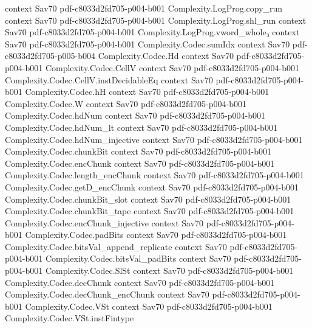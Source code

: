 \begin{theorem}
  {context}
  {Sav70}
  {pdf-c8033d2fd705-p004-b001}
\proofstep
  {Complexity.LogProg.copy_run}
  {context}
  {Sav70}
  {pdf-c8033d2fd705-p004-b001}
\proofstep
  {Complexity.LogProg.shl_run}
  {context}
  {Sav70}
  {pdf-c8033d2fd705-p004-b001}
\proofstep
  {Complexity.LogProg.vword_whole₃}
  {context}
  {Sav70}
  {pdf-c8033d2fd705-p004-b001}
\proofstep
  {Complexity.Codec.sumIdx}
  {context}
  {Sav70}
  {pdf-c8033d2fd705-p005-b004}
\proofstep
  {Complexity.Codec.Hd}
  {context}
  {Sav70}
  {pdf-c8033d2fd705-p004-b001}
\proofstep
  {Complexity.Codec.CellV}
  {context}
  {Sav70}
  {pdf-c8033d2fd705-p004-b001}
\proofstep
  {Complexity.Codec.CellV.instDecidableEq}
  {context}
  {Sav70}
  {pdf-c8033d2fd705-p004-b001}
\proofstep
  {Complexity.Codec.hH}
  {context}
  {Sav70}
  {pdf-c8033d2fd705-p004-b001}
\proofstep
  {Complexity.Codec.W}
  {context}
  {Sav70}
  {pdf-c8033d2fd705-p004-b001}
\proofstep
  {Complexity.Codec.hdNum}
  {context}
  {Sav70}
  {pdf-c8033d2fd705-p004-b001}
\proofstep
  {Complexity.Codec.hdNum_lt}
  {context}
  {Sav70}
  {pdf-c8033d2fd705-p004-b001}
\proofstep
  {Complexity.Codec.hdNum_injective}
  {context}
  {Sav70}
  {pdf-c8033d2fd705-p004-b001}
\proofstep
  {Complexity.Codec.chunkBit}
  {context}
  {Sav70}
  {pdf-c8033d2fd705-p004-b001}
\proofstep
  {Complexity.Codec.encChunk}
  {context}
  {Sav70}
  {pdf-c8033d2fd705-p004-b001}
\proofstep
  {Complexity.Codec.length_encChunk}
  {context}
  {Sav70}
  {pdf-c8033d2fd705-p004-b001}
\proofstep
  {Complexity.Codec.getD_encChunk}
  {context}
  {Sav70}
  {pdf-c8033d2fd705-p004-b001}
\proofstep
  {Complexity.Codec.chunkBit_slot}
  {context}
  {Sav70}
  {pdf-c8033d2fd705-p004-b001}
\proofstep
  {Complexity.Codec.chunkBit_tape}
  {context}
  {Sav70}
  {pdf-c8033d2fd705-p004-b001}
\proofstep
  {Complexity.Codec.encChunk_injective}
  {context}
  {Sav70}
  {pdf-c8033d2fd705-p004-b001}
\proofstep
  {Complexity.Codec.padBits}
  {context}
  {Sav70}
  {pdf-c8033d2fd705-p004-b001}
\proofstep
  {Complexity.Codec.bitsVal_append_replicate}
  {context}
  {Sav70}
  {pdf-c8033d2fd705-p004-b001}
\proofstep
  {Complexity.Codec.bitsVal_padBits}
  {context}
  {Sav70}
  {pdf-c8033d2fd705-p004-b001}
\proofstep
  {Complexity.Codec.SlSt}
  {context}
  {Sav70}
  {pdf-c8033d2fd705-p004-b001}
\proofstep
  {Complexity.Codec.decChunk}
  {context}
  {Sav70}
  {pdf-c8033d2fd705-p004-b001}
\proofstep
  {Complexity.Codec.decChunk_encChunk}
  {context}
  {Sav70}
  {pdf-c8033d2fd705-p004-b001}
\proofstep
  {Complexity.Codec.VSt}
  {context}
  {Sav70}
  {pdf-c8033d2fd705-p004-b001}
\proofstep
  {Complexity.Codec.VSt.instFintype}

\end{theorem}
